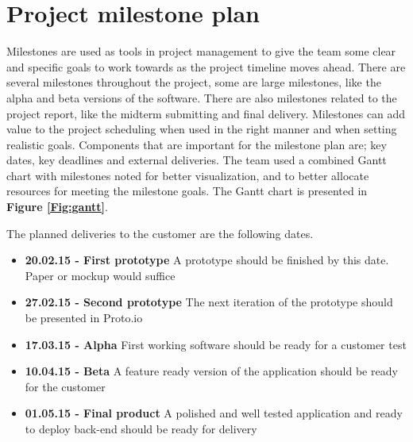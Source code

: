\section{Project milestone plan}
\label{sec:milestone_plan}

Milestones are used as tools in project management to give the team some clear and specific goals to work towards as the project timeline moves ahead. There are several milestones throughout the project, some are large milestones, like the alpha and beta versions of the software. There are also milestones related to the project report, like the midterm submitting and final delivery. Milestones can add value to the project scheduling when used in the right manner and when setting realistic goals. Components that are important for the milestone plan are; key dates, key deadlines and external deliveries. The team used a combined Gantt chart with milestones noted for better visualization, and to better allocate resources for meeting the milestone goals. The Gantt chart is presented in \textbf{Figure \ref{Fig:gantt}}.\newline

The planned deliveries to the customer are the following dates. 
\begin{itemize}
\item \textbf{20.02.15 - First prototype} \newline
A prototype should be finished by this date. Paper or mockup would suffice  
\item \textbf{27.02.15 - Second prototype}  \newline
The next iteration of the prototype should be presented in Proto.io \cite{protoIO}
\item \textbf{17.03.15 - Alpha} \newline
First working software should be ready for a customer test
\item \textbf{10.04.15 - Beta}  \newline
A feature ready version of the application should be ready for the customer 
\item \textbf{01.05.15 - Final product} \newline
A polished and well tested application and ready to deploy back-end should be ready for delivery 
\end{itemize}


